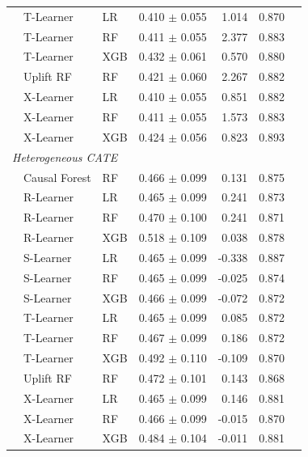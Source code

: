 \begin{table}[t]
\begin{tabular}{llllrrr}
  & T-Learner & LR & 0.410 $\pm$ 0.055 & 1.014 & 0.870 \\
  & T-Learner & RF & 0.411 $\pm$ 0.055 & 2.377 & 0.883 \\
  & T-Learner & XGB & 0.432 $\pm$ 0.061 & 0.570 & 0.880 \\
  & Uplift RF & RF & 0.421 $\pm$ 0.060 & 2.267 & 0.882 \\
  & X-Learner & LR & 0.410 $\pm$ 0.055 & 0.851 & 0.882 \\
  & X-Learner & RF & 0.411 $\pm$ 0.055 & 1.573 & 0.883 \\
  & X-Learner & XGB & 0.424 $\pm$ 0.056 & 0.823 & 0.893 \\
\midrule
\multicolumn{6}{l}{\textit{Heterogeneous CATE}} \\
  & Causal Forest & RF & 0.466 $\pm$ 0.099 & 0.131 & 0.875 \\
  & R-Learner & LR & 0.465 $\pm$ 0.099 & 0.241 & 0.873 \\
  & R-Learner & RF & 0.470 $\pm$ 0.100 & 0.241 & 0.871 \\
  & R-Learner & XGB & 0.518 $\pm$ 0.109 & 0.038 & 0.878 \\
  & S-Learner & LR & 0.465 $\pm$ 0.099 & -0.338 & 0.887 \\
  & S-Learner & RF & 0.465 $\pm$ 0.099 & -0.025 & 0.874 \\
  & S-Learner & XGB & 0.466 $\pm$ 0.099 & -0.072 & 0.872 \\
  & T-Learner & LR & 0.465 $\pm$ 0.099 & 0.085 & 0.872 \\
  & T-Learner & RF & 0.467 $\pm$ 0.099 & 0.186 & 0.872 \\
  & T-Learner & XGB & 0.492 $\pm$ 0.110 & -0.109 & 0.870 \\
  & Uplift RF & RF & 0.472 $\pm$ 0.101 & 0.143 & 0.868 \\
  & X-Learner & LR & 0.465 $\pm$ 0.099 & 0.146 & 0.881 \\
  & X-Learner & RF & 0.466 $\pm$ 0.099 & -0.015 & 0.870 \\
  & X-Learner & XGB & 0.484 $\pm$ 0.104 & -0.011 & 0.881 \\
\midrule
\bottomrule
\end{tabular}
\end{table}